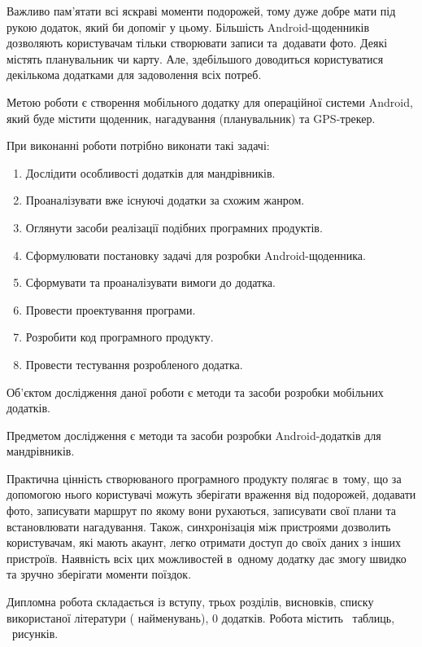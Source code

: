 \documentclass[../main.tex]{subfiles}
\begin{document}
Важливо пам'ятати всі яскраві моменти подорожей, тому дуже добре мати під рукою додаток, який би допоміг у цьому. Більшість Android-щоденників дозволяють користувачам тільки створювати записи та~додавати фото. Деякі містять планувальник чи карту. Але, здебільшого доводиться користуватися декількома додатками для задоволення всіх потреб.

Метою роботи є створення мобільного додатку для операційної системи Android, який буде містити щоденник, нагадування (планувальник) та \mbox{GPS-трекер}.

При виконанні роботи потрібно виконати такі задачі:
\begin{enumerate}
\item Дослідити особливості додатків для мандрівників.
\item Проаналізувати вже існуючі додатки за схожим жанром.
\item Оглянути засоби реалізації подібних програмних продуктів.
\item Сформулювати постановку задачі для розробки Android-щоденника.
\item Сформувати та проаналізувати вимоги до додатка.
\item Провести проектування програми.
\item Розробити код програмного продукту.
\item Провести тестування розробленого додатка.
\end{enumerate}

Об'єктом дослідження даної роботи є методи та засоби розробки мобільних додатків. 

Предметом дослідження є методи та засоби розробки Android-додатків для мандрівників.

Практична цінність створюваного програмного продукту полягає в~тому, що за допомогою нього користувачі можуть зберігати враження від подорожей, додавати фото, записувати маршрут по якому вони рухаються, записувати свої плани та встановлювати нагадування. Також, синхронізація між пристроями дозволить користувачам, які мають акаунт, легко отримати доступ до своїх даних з інших пристроїв. Наявність всіх цих можливостей в~одному додатку дає змогу швидко та зручно зберігати моменти поїздок.

Дипломна робота складається із вступу, трьох розділів, висновків, списку використаної літератури ( найменувань), 0 додатків. Робота містить \totaltables\ таблиць, \totalfigures\ рисунків. 
\end{document}
